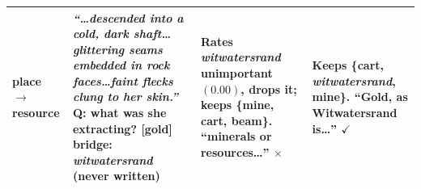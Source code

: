 \begin{table}[t]
\begin{tabular}{@{}p{}p{}p{}p{}@{}}
place $\rightarrow$\newline resource &
\emph{``\ldots descended into a cold, dark shaft\ldots glittering seams
embedded in rock faces\ldots faint flecks clung to her skin.''}\newline
\textbf{Q:} what was she extracting? \textbf{[gold]}\newline
bridge: \textbf{\emph{witwatersrand}} (never written) &
\textcolor{failorange}{Rates \emph{witwatersrand} unimportant $(0.00)$, drops
it; keeps \{mine, cart, beam\}.}\newline
\textcolor{failorange}{``minerals or resources\ldots'' $\times$} &
\textcolor{wsblue}{Keeps \{cart, \emph{witwatersrand}, mine\}.}\newline
\textcolor{wsblue}{``\textbf{Gold}, as Witwatersrand is\ldots'' $\checkmark$} \\

\bottomrule
\end{tabular}
\end{table}
